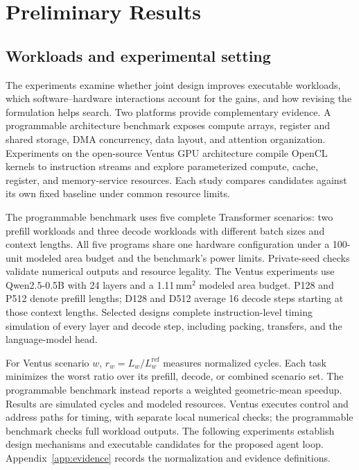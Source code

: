 \section{Preliminary Results}\label{sec:evaluation}
\subsection{Workloads and experimental setting}
The experiments examine whether joint design improves executable workloads, which software--hardware interactions account for the gains, and how revising the formulation helps search. Two platforms provide complementary evidence. A programmable architecture benchmark exposes compute arrays, register and shared storage, DMA concurrency, data layout, and attention organization. Experiments on the open-source Ventus GPU architecture compile OpenCL kernels to instruction streams and explore parameterized compute, cache, register, and memory-service resources. Each study compares candidates against its own fixed baseline under common resource limits.

The programmable benchmark uses five complete Transformer scenarios: two prefill workloads and three decode workloads with different batch sizes and context lengths. All five programs share one hardware configuration under a 100-unit modeled area budget and the benchmark's power limits. Private-seed checks validate numerical outputs and resource legality. The Ventus experiments use Qwen2.5-0.5B with 24 layers and a 1.11\,mm$^2$ modeled area budget. P128 and P512 denote prefill lengths; D128 and D512 average 16 decode steps starting at those context lengths. Selected designs complete instruction-level timing simulation of every layer and decode step, including packing, transfers, and the language-model head.

For Ventus scenario $w$, $r_w=L_w/L_w^{\mathrm{ref}}$ measures normalized cycles. Each task minimizes the worst ratio over its prefill, decode, or combined scenario set. The programmable benchmark instead reports a weighted geometric-mean speedup. Results are simulated cycles and modeled resources. Ventus executes control and address paths for timing, with separate local numerical checks; the programmable benchmark checks full workload outputs. The following experiments establish design mechanisms and executable candidates for the proposed agent loop. Appendix~\ref{app:evidence} records the normalization and evidence definitions.

